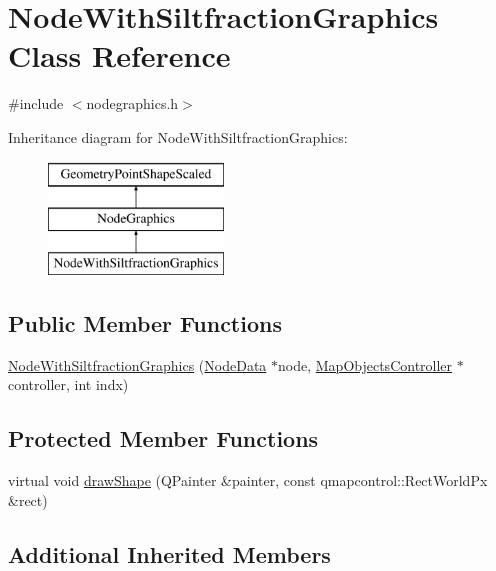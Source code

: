 \hypertarget{class_node_with_siltfraction_graphics}{}\section{Node\+With\+Siltfraction\+Graphics Class Reference}
\label{class_node_with_siltfraction_graphics}


{\ttfamily \#include $<$nodegraphics.\+h$>$}

Inheritance diagram for Node\+With\+Siltfraction\+Graphics\+:\begin{figure}[H]
\begin{center}
\leavevmode
\includegraphics[height=3.000000cm]{df/dff/class_node_with_siltfraction_graphics}
\end{center}
\end{figure}
\subsection*{Public Member Functions}
\begin{DoxyCompactItemize}
\item 
\mbox{\hyperlink{class_node_with_siltfraction_graphics_a13029d4119482fe5977424c3cd551d15}{Node\+With\+Siltfraction\+Graphics}} (\mbox{\hyperlink{class_node_data}{Node\+Data}} $\ast$node, \mbox{\hyperlink{class_map_objects_controller}{Map\+Objects\+Controller}} $\ast$controller, int indx)
\end{DoxyCompactItemize}
\subsection*{Protected Member Functions}
\begin{DoxyCompactItemize}
\item 
virtual void \mbox{\hyperlink{class_node_with_siltfraction_graphics_ad498aedce039d84e20250885ecfba2c2}{draw\+Shape}} (Q\+Painter \&painter, const qmapcontrol\+::\+Rect\+World\+Px \&rect)
\end{DoxyCompactItemize}
\subsection*{Additional Inherited Members}


